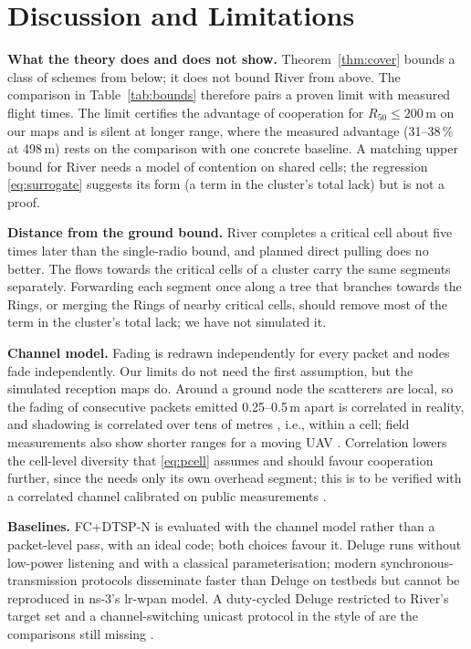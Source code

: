 \section{Discussion and Limitations}\label{sec:discussion}
\textbf{What the theory does and does not show.} Theorem~\ref{thm:cover} bounds a class of schemes from below; it does
not bound River from above. The comparison in Table~\ref{tab:bounds} therefore pairs a proven limit with measured
flight times. The limit certifies the advantage of cooperation for $R_{50}\le200$\,m on our maps and is silent at longer
range, where the measured advantage (31--38\,\% at 498\,m) rests on the comparison with one concrete baseline. A matching
upper bound for River needs a model of contention on shared cells; the regression \eqref{eq:surrogate} suggests its
form (a term in the cluster's total lack) but is not a proof.

\textbf{Distance from the ground bound.} River completes a critical cell about five times later than the single-radio
bound, and planned direct pulling does no better. The flows towards the critical cells of a cluster carry the same
segments separately. Forwarding each segment once along a tree that branches towards the Rings, or merging the Rings of
nearby critical cells, should remove most of the term in the cluster's total lack; we have not simulated it.

\textbf{Channel model.} Fading is redrawn independently for every packet and nodes fade independently. Our limits do not
need the first assumption, but the simulated reception maps do. Around a ground node the scatterers are local, so the
fading of consecutive packets emitted 0.25--0.5\,m apart is correlated in reality, and shadowing is correlated over tens
of metres \cite{gudmundson1991}, i.e., within a cell; field measurements also show shorter ranges for a moving UAV
\cite{nekrasov2019}. Correlation lowers the cell-level diversity that \eqref{eq:pcell} assumes and should favour
cooperation further, since the \spine{} needs only its own overhead segment; this is to be verified with a correlated
channel calibrated on public measurements .

\textbf{Baselines.} FC+DTSP-N is evaluated with the channel model rather than a packet-level pass, with an ideal code;
both choices favour it. Deluge runs without low-power listening and with a classical parameterisation; modern
synchronous-transmission protocols \cite{doddavenkatappa2013,du2017,ferrari2012} disseminate faster than Deluge on
testbeds but cannot be reproduced in ns-3's lr-wpan model. A duty-cycled Deluge restricted to River's target set and a
channel-switching unicast protocol in the style of \cite{liang2008} are the comparisons still missing .

